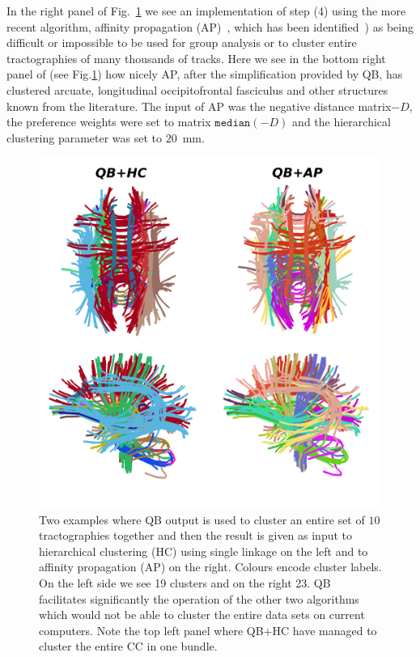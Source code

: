 \documentclass[preprint,authoryear,a4paper,10pt,onecolumn]{elsarticle}
\begin{document}
In the right panel of Fig.~\ref{Flo:LSC+HC+AP} we see an implementation
of step (4) using the more recent algorithm, affinity propagation
(AP)~\citep{dueck2009affinity}, which has been
identified~\citep{malcolm2009filtered}) as being difficult or impossible
to be used for group analysis or to cluster entire tractographies of
many thousands of tracks.
Here we see in the bottom right panel of (see Fig.\ref{Flo:LSC+HC+AP})
how nicely AP, after the simplification provided by QB, has clustered
arcuate, longitudinal occipitofrontal fasciculus and other structures
known from the literature. The input of AP was the negative distance
matrix$-D$, the preference weights were set to matrix $\mathtt{median}(-D)$
and the hierarchical clustering parameter was set to $20$~mm.

\begin{figure}
\begin{centering}
\includegraphics[scale=0.7]{last_figures/LSC_with_others}
\par\end{centering}
\caption{Two examples where QB output is used to cluster an entire set
  of $10$ tractographies together and then the result is given as input
  to hierarchical clustering (HC) using single linkage on the left and
  to affinity propagation (AP) on the right. Colours encode cluster
  labels. On the left side we see 19 clusters and on the right 23. QB
  facilitates significantly the operation of the other two algorithms
  which would not be able to cluster the entire data sets on current
  computers. Note the top left panel where QB+HC have managed to cluster
  the entire CC in one bundle.\label{Flo:LSC+HC+AP}}
\end{figure}
\end{document}
